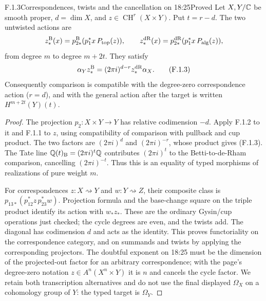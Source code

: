 \begin{result}{F.1.3}{Correspondences, twists and the cancellation on 18:25}{Proved}
Let $X,Y/\mathbb C$ be smooth proper, $d=\dim X$, and $z\in\operatorname{CH}^r(X\times Y)$. Put $t=r-d$. The two untwisted actions are
\[
 z_*^{\mathrm B}(x)=p_{2*}^{\mathrm B}(p_1^*x\,P_{\mathrm{top}}(z)),\qquad
 z_*^{\mathrm{dR}}(x)=p_{2*}^{\mathrm{dR}}(p_1^*x\,P_{\mathrm{alg}}(z)),
\]
from degree $m$ to degree $m+2t$. They satisfy
\[
 \alpha_Yz_*^{\mathrm B}=(2\pi i)^{d-r}z_*^{\mathrm{dR}}\alpha_X.
 \tag{F.1.3}
\]
Consequently comparison is compatible with the degree-zero correspondence action ($r=d$), and with the general action after the target is written $H^{m+2t}(Y)(t)$.
\end{result}
\begin{proof}
The projection $p_2:X\times Y\to Y$ has relative codimension $-d$. Apply F.1.2 to it and F.1.1 to $z$, using compatibility of comparison with pullback and cup product. The two factors are $(2\pi i)^d$ and $(2\pi i)^{-r}$, whose product gives (F.1.3). The Tate line $\mathbb Q(t)_{\mathrm B}=(2\pi i)^t\mathbb Q$ contributes $(2\pi i)^t$ to the Betti-to-de-Rham comparison, cancelling $(2\pi i)^{-t}$. Thus this is an equality of typed morphisms of realizations of pure weight $m$.

For correspondences $z:X\rightsquigarrow Y$ and $w:Y\rightsquigarrow Z$, their composite class is $p_{13*}(p_{12}^*z\,p_{23}^*w)$. Projection formula and the base-change square on the triple product identify its action with $w_*z_*$. These are the ordinary Gysin/cup operations just checked; the cycle degrees are even, and the twists add. The diagonal has codimension $d$ and acts as the identity. This proves functoriality on the correspondence category, and on summands and twists by applying the corresponding projectors. The doubtful exponent on 18:25 must be the dimension of the projected-out factor for an arbitrary correspondence; with the page's degree-zero notation $z\in A^n(X^n\times Y)$ it is $n$ and cancels the cycle factor. We retain both transcription alternatives and do not use the final displayed $\Omega_X$ on a cohomology group of $Y$: the typed target is $\Omega_Y$.
\end{proof}

